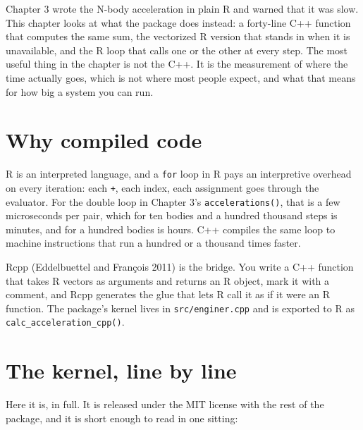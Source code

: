\documentclass[
  10.5pt,
  letterpaper,
]{scrbook}
\theoremstyle{definition}
\theoremstyle{plain}
\theoremstyle{remark}
\begin{document}
Chapter 3 wrote the N-body acceleration in plain R and warned that it
was slow. This chapter looks at what the package does instead: a
forty-line C++ function that computes the same sum, the vectorized R
version that stands in when it is unavailable, and the R loop that calls
one or the other at every step. The most useful thing in the chapter is
not the C++. It is the measurement of where the time actually goes,
which is not where most people expect, and what that means for how big a
system you can run.

\section{Why compiled code}\label{why-compiled-code}

R is an interpreted language, and a \texttt{for} loop in R pays an
interpretive overhead on every iteration: each \texttt{+}, each index,
each assignment goes through the evaluator. For the double loop in
Chapter 3's \texttt{accelerations()}, that is a few microseconds per
pair, which for ten bodies and a hundred thousand steps is minutes, and
for a hundred bodies is hours. C++ compiles the same loop to machine
instructions that run a hundred or a thousand times faster.

Rcpp (Eddelbuettel and François 2011) is the bridge. You write a C++
function that takes R vectors as arguments and returns an R object, mark
it with a comment, and Rcpp generates the glue that lets R call it as if
it were an R function. The package's kernel lives in
\texttt{src/enginer.cpp} and is exported to R as
\texttt{calc\_acceleration\_cpp()}.

\section{The kernel, line by line}\label{the-kernel-line-by-line}

Here it is, in full. It is released under the MIT license with the rest
of the package, and it is short enough to read in one sitting:
\end{document}
